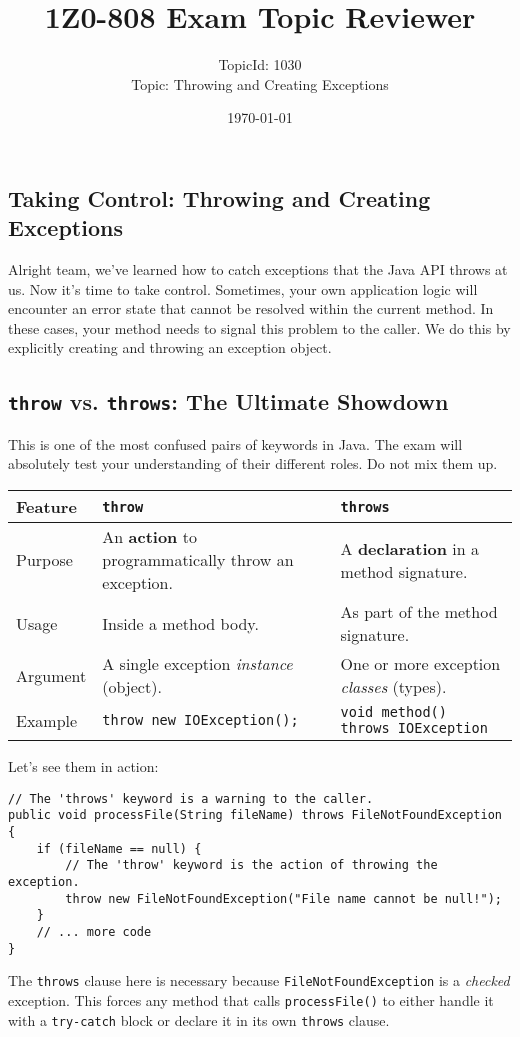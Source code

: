 \documentclass[12pt]{article}
\title{\textbf{1Z0-808 Exam Topic Reviewer}}
\author{TopicId: 1030 \\ Topic: Throwing and Creating Exceptions}
\date{\today}
\begin{document}
\maketitle
\newpage\begin{enumerate}[label=(\arabic*)]
\section*{Taking Control: Throwing and Creating Exceptions}
Alright team, we've learned how to catch exceptions that the Java API throws at us. Now it's time to take control. Sometimes, your own application logic will encounter an error state that cannot be resolved within the current method. In these cases, your method needs to signal this problem to the caller. We do this by explicitly creating and throwing an exception object.

\subsection{\texttt{throw} vs. \texttt{throws}: The Ultimate Showdown}
This is one of the most confused pairs of keywords in Java. The exam will absolutely test your understanding of their different roles. Do not mix them up.
\begin{tabular}{|l|l|l|}
\hline
\textbf{Feature} & \textbf{\texttt{throw}} & \textbf{\texttt{throws}} \\
\hline
Purpose & An \textbf{action} to programmatically throw an exception. & A \textbf{declaration} in a method signature. \\
\hline
Usage & Inside a method body. & As part of the method signature. \\
\hline
Argument & A single exception \textit{instance} (object). & One or more exception \textit{classes} (types). \\
\hline
Example & \texttt{throw new IOException();} & \texttt{void method() throws IOException} \\
\hline
\end{tabular}

Let's see them in action:
\begin{verbatim}
// The 'throws' keyword is a warning to the caller.
public void processFile(String fileName) throws FileNotFoundException {
    if (fileName == null) {
        // The 'throw' keyword is the action of throwing the exception.
        throw new FileNotFoundException("File name cannot be null!");
    }
    // ... more code
}
\end{verbatim}
The \texttt{throws} clause here is necessary because \texttt{FileNotFoundException} is a \textit{checked} exception. This forces any method that calls \texttt{processFile()} to either handle it with a \texttt{try-catch} block or declare it in its own \texttt{throws} clause.


\end{enumerate}
\end{document}
